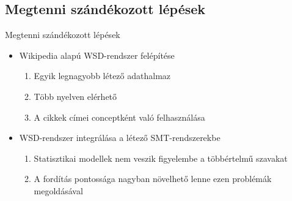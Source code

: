 \subsection{Megtenni szándékozott lépések}

\begin{frame}{Megtenni szándékozott lépések}
	
	\begin{itemize}
		
		\item Wikipedia alapú WSD-rendszer felépítése
		\begin{enumerate}
			\item Egyik legnagyobb létező adathalmaz
			\item Több nyelven elérhető
			\item A cikkek címei conceptként való felhasználása
		\end{enumerate}
		
		\item WSD-rendszer integrálása a létező SMT-rendszerekbe
		\begin{enumerate}
			\item Statisztikai modellek nem veszik figyelembe a  többértelmű szavakat
			\item A fordítás pontossága nagyban növelhető lenne ezen problémák megoldásával
		\end{enumerate}
		
	\end{itemize}

\end{frame}

\newcommand{\savecounter}{\setcounter{enumcounter}{\theenumi}}
\newcommand{\restorecounter}{\setcounter{enumi}{\theenumcounter}}

